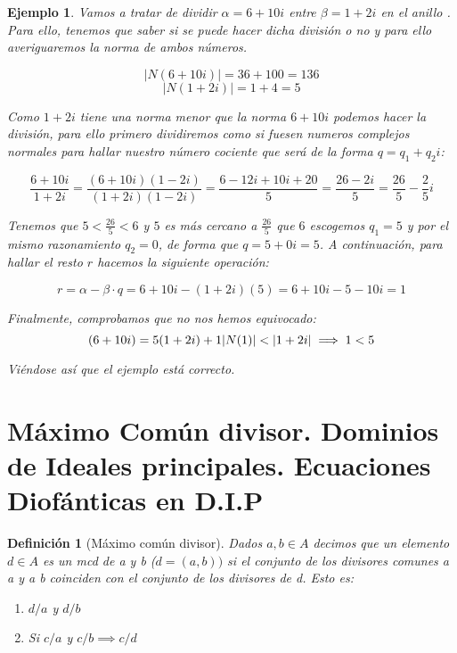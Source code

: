 \documentclass[11pt, a4paper, titlepage]{article}
\providecommand{\abs}[1]{\lvert#1\rvert}
\theoremstyle{theorem-style}
\theoremstyle{definition-style}
\newtheorem*{ndef}{Definición}
\theoremstyle{remark-style}
\theoremstyle{example-style}
\newtheorem*{ejemplo}{Ejemplo}
\newenvironment{nlist}
{\begin{enumerate}
\renewcommand\labelenumi{(\emph{\roman{enumi})}}}
{\end{enumerate}}
\begin{document}
\begin{ejemplo}
Vamos a tratar de dividir $\alpha=6+10i$ entre $\beta=1+2i$ en el anillo . Para ello, tenemos que saber si se puede hacer dicha división o no y para ello averiguaremos la norma de ambos números.

$$\abs{N(6+10i)}=36+100=136$$
$$\abs{N(1+2i)}=1+4=5$$

Como $1+2i$ tiene una norma menor que la norma $6+10i$ podemos hacer la división, para ello primero dividiremos como si fuesen numeros complejos normales para hallar nuestro número cociente que será de la forma $q=q_1+q_2i$:

\[
	\frac{6+10i}{1+2i}=\frac{(6+10i)(1-2i)}{(1+2i)(1-2i)}=\frac{6-12i+10i+20}{5}=\frac{26-2i}{5}=\frac{26}{5}-\frac{2}{5}i
\]

Tenemos que $5<\frac{26}{5}<6$ y $5$ es más cercano a $\frac{26}{5}$ que $6$ escogemos $q_1=5$ y por el mismo razonamiento $q_2=0$, de forma que $q=5+0i=5$. A continuación, para hallar el resto $r$ hacemos la siguiente operación:

\[
	r=\alpha-\beta \cdot q = 6+10i - (1+2i)(5)=6+10i-5-10i=1
\]

Finalmente, comprobamos que no nos hemos equivocado:
\[
	(6+10i)=5(1+2i)+1\\
	\abs{N(1)}<\abs{1+2i} \implies 1<5
\]

Viéndose así que el ejemplo está correcto.

\end{ejemplo}

\section{Máximo Común divisor. Dominios de Ideales principales. Ecuaciones Diofánticas en D.I.P}


\begin{ndef}[Máximo común divisor]

Dados $a,b \in A$ decimos que un elemento $d\in A$ es un mcd de a y b ($d=(a,b))$ si el conjunto de los divisores comunes a a y a b coinciden con el conjunto de los divisores de d. Esto es:

\begin{nlist}
	\item $d/a$ y $d/b$
	\item Si $c/a$ y $c/b \implies c/d$ 
\end{nlist} 
	
\end{ndef}
\end{document}
